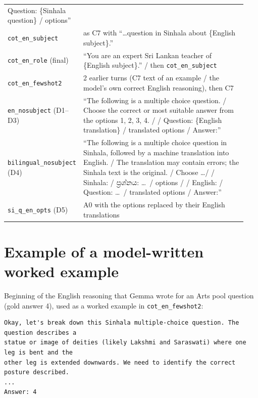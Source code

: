 \documentclass[10pt,a4paper]{article}
\newcommand{\si}[1]{{\sinhalafont #1}}
\newcommand{\cond}[1]{\texttt{#1}}
\begin{document}
{\begin{longtable}{p{0.24\linewidth}p{0.70\linewidth}}
Question: \{Sinhala question\} / options''\\
\cond{cot\_en\_subject} & as C7 with ``\ldots question in Sinhala about \{English subject\}.''\\
\cond{cot\_en\_role} (final) & ``You are an expert Sri Lankan teacher of \{English subject\}.'' / then
\cond{cot\_en\_subject}\\
\cond{cot\_en\_fewshot2} & 2 earlier turns (C7 text of an example / the model's own correct English reasoning),
then C7\\
\cond{en\_nosubject} (D1--D3) & ``The following is a multiple choice question. / Choose the correct or most suitable
answer from the options 1, 2, 3, 4. / / Question: \{English translation\} / translated options / Answer:''\\
\cond{bilingual\_nosubject} (D4) & ``The following is a multiple choice question in Sinhala, followed by a machine
translation into English. / The translation may contain errors; the Sinhala text is the original. / Choose \ldots /
/ Sinhala: / \si{ප්‍රශ්නය}: \ldots\ / options / / English: / Question: \ldots\ / translated options / Answer:''\\
\cond{si\_q\_en\_opts} (D5) & A0 with the options replaced by their English translations\\
\bottomrule
\end{longtable}}

\section{Example of a model-written worked example}
Beginning of the English reasoning that Gemma wrote for an Arts pool question (gold answer 4), used as a worked
example in \cond{cot\_en\_fewshot2}:
\begin{Verbatim}[fontsize=\small,frame=single]
Okay, let's break down this Sinhala multiple-choice question. The question describes a
statue or image of deities (likely Lakshmi and Saraswati) where one leg is bent and the
other leg is extended downwards. We need to identify the correct posture described.
...
Answer: 4
\end{Verbatim}
\end{document}
